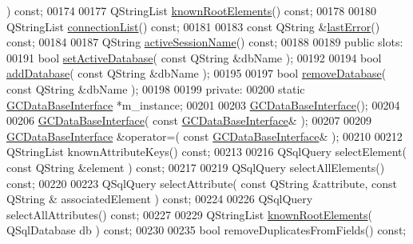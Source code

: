 \begin{DoxyCode}
       ) \textcolor{keyword}{const};
00174 
00177   QStringList \hyperlink{class_g_c_data_base_interface_ac5c57277f9476ab74cfe13fbcee52f15}{knownRootElements}() \textcolor{keyword}{const};
00178 
00180   QStringList \hyperlink{class_g_c_data_base_interface_ab34f716b89ee96de9bf599f5d5d2c152}{connectionList}() \textcolor{keyword}{const};
00181 
00183   \textcolor{keyword}{const} QString &\hyperlink{class_g_c_data_base_interface_a30d5bbea06462c5ed0f76ad8a68c4b08}{lastError}() \textcolor{keyword}{const};
00184 
00187   QString \hyperlink{class_g_c_data_base_interface_a53aff43e5997c5f0180ba214205e5bc6}{activeSessionName}() \textcolor{keyword}{const};
00188   
00189 \textcolor{keyword}{public} slots:
00191   \textcolor{keywordtype}{bool} \hyperlink{class_g_c_data_base_interface_a176952c9ba2fbc90809f9d64ea14a69f}{setActiveDatabase}( \textcolor{keyword}{const} QString &dbName );
00192 
00194   \textcolor{keywordtype}{bool} \hyperlink{class_g_c_data_base_interface_a6b3cc67ba9e4bdf58b49869243446764}{addDatabase}( \textcolor{keyword}{const} QString &dbName );
00195 
00197   \textcolor{keywordtype}{bool} \hyperlink{class_g_c_data_base_interface_a86dcb92e64a35e3fb72fa58a4bacc3b9}{removeDatabase}( \textcolor{keyword}{const} QString &dbName );
00198 
00199 \textcolor{keyword}{private}:
00200   \textcolor{keyword}{static} \hyperlink{class_g_c_data_base_interface}{GCDataBaseInterface} *m\_instance;
00201 
00203   \hyperlink{class_g_c_data_base_interface}{GCDataBaseInterface}();
00204 
00206   \hyperlink{class_g_c_data_base_interface}{GCDataBaseInterface}( \textcolor{keyword}{const} \hyperlink{class_g_c_data_base_interface}{GCDataBaseInterface}& );
00207 
00209   \hyperlink{class_g_c_data_base_interface}{GCDataBaseInterface} &operator=( \textcolor{keyword}{const} \hyperlink{class_g_c_data_base_interface}{GCDataBaseInterface}& );
00210 
00212   QStringList knownAttributeKeys() \textcolor{keyword}{const};
00213 
00216   QSqlQuery selectElement( \textcolor{keyword}{const} QString &element ) \textcolor{keyword}{const};
00217 
00219   QSqlQuery selectAllElements() \textcolor{keyword}{const};
00220 
00223   QSqlQuery selectAttribute( \textcolor{keyword}{const} QString &attribute, \textcolor{keyword}{const} QString &
      associatedElement ) \textcolor{keyword}{const};
00224 
00226   QSqlQuery selectAllAttributes() \textcolor{keyword}{const};
00227 
00229   QStringList \hyperlink{class_g_c_data_base_interface_ac5c57277f9476ab74cfe13fbcee52f15}{knownRootElements}( QSqlDatabase db ) \textcolor{keyword}{const};
00230 
00235   \textcolor{keywordtype}{bool} removeDuplicatesFromFields() \textcolor{keyword}{const};

\end{DoxyCode}
